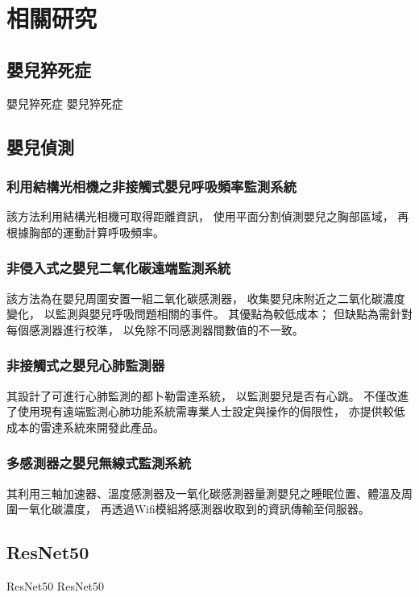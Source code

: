 \documentclass[class=NCU_thesis, crop=false]{standalone}
\begin{document}
\chapter{相關研究}

\section{嬰兒猝死症}
嬰兒猝死症 嬰兒猝死症

\section{嬰兒偵測}
\subsection{利用結構光相機之非接觸式嬰兒呼吸頻率監測系統}
該方法利用結構光相機可取得距離資訊，
使用平面分割偵測嬰兒之胸部區域，
再根據胸部的運動計算呼吸頻率。

\subsection{非侵入式之嬰兒二氧化碳遠端監測系統}
該方法為在嬰兒周圍安置一組二氧化碳感測器，
收集嬰兒床附近之二氧化碳濃度變化，
以監測與嬰兒呼吸問題相關的事件。
其優點為較低成本；
但缺點為需針對每個感測器進行校準，
以免除不同感測器間數值的不一致。

\subsection{非接觸式之嬰兒心肺監測器}
其設計了可進行心肺監測的都卜勒雷達系統，
以監測嬰兒是否有心跳。
不僅改進了使用現有遠端監測心肺功能系統需專業人士設定與操作的侷限性，
亦提供較低成本的雷達系統來開發此產品。

\subsection{多感測器之嬰兒無線式監測系統}
其利用三軸加速器、溫度感測器及一氧化碳感測器量測嬰兒之睡眠位置、體溫及周圍一氧化碳濃度，
再透過Wifi模組將感測器收取到的資訊傳輸至伺服器。

\section{ResNet50}
ResNet50 ResNet50
\end{document}
